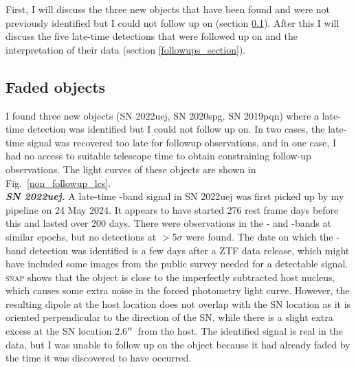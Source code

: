 \documentclass[a4paper,oneside,12pt, class=Latex/Classes/PhDthesisPSnPDF, crop=false]{standalone}
\begin{document}
First, I will discuss the three new objects that have been found and were not previously identified but I could not follow up on (section \ref{sec:faded_objects}). After this I will discuss the five late-time detections that were followed up on and the interpretation of their data (section \ref{followups_section}).

\subsection{Faded objects}
\label{sec:faded_objects}
I found three new objects (SN 2022uej, SN 2020spg, SN 2019pqn) where a late-time detection was identified but I could not follow up on. In two cases, the late-time signal was recovered too late for followup observations, and in one case, I had no access to suitable telescope time to obtain constraining follow-up observations. The light curves of these objects are shown in Fig.~\ref{non_followup_lcs}.\\

\textit{\textbf{SN 2022uej.}}
A late-time \ztfr-band signal in SN 2022uej was first picked up by my pipeline on 24 May 2024. It appears to have started 276 rest frame days before this and lasted over 200 days. There were observations in the \ztfg- and \ztfi-bands at similar epochs, but no detections at $>$5$\sigma$ were found. The date on which the \ztfr-band detection was identified is a few days after a ZTF data release, which might have included some images from the public survey needed for a detectable signal. \textsc{snap} shows that the object is close to the imperfectly subtracted host nucleus, which causes some extra noise in the forced photometry light curve. However, the resulting dipole at the host location does not overlap with the SN location as it is oriented perpendicular to the direction of the SN, while there is a slight extra excess at the SN location 2.6$^{\prime\prime}$\ from the host. The identified signal is real in the data, but I was unable to follow up on the object because it had already faded by the time it was discovered to have occurred.\\
\end{document}
